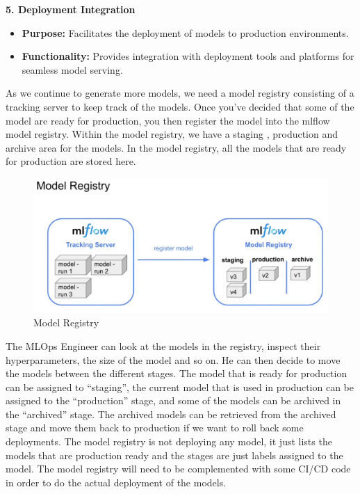 \documentclass[letterpaper,12pt,notitlepage,twoside]{report}
\begin{document}
\textbf{5. Deployment Integration}
\begin{itemize}[noitemsep, topsep=0pt]
    \item \textbf{Purpose:} Facilitates the deployment of models to production environments.
    \item \textbf{Functionality:} Provides integration with deployment tools and platforms for seamless model serving.
\end{itemize}

As we continue to generate more models, we need a model registry consisting of a tracking server to keep track of the models. Once you've decided that some of the model are ready for production, you then register the model into the mlflow model registry. Within the model registry, we have a staging , production and archive area for the models. In the model registry, all the models that are ready for production are stored here. 

\begin{figure}[h]
	\centering
	\includegraphics[width=\textwidth]{Images/model registry.png}
	\caption{Model Registry}
	\label{fig:5}
\end{figure}
\FloatBarrier

The MLOps Engineer can look at the models in the registry, inspect their hyperparameters, the size of the model and so on. He can then decide to move the models between the different stages. The model that is ready for production can be assigned to ``staging'', the current model that is used in production can be assigned to the ``production'' stage, and some of the models can be archived in the ``archived'' stage. The archived models can be retrieved from the archived stage and move them back to production if we want to roll back some deployments. The model registry is not deploying any model, it just lists the models that are production ready and the stages are just labels assigned to the model. The model registry will need to be complemented with some CI/CD code in order to do the actual deployment of the models. 
\end{document}
